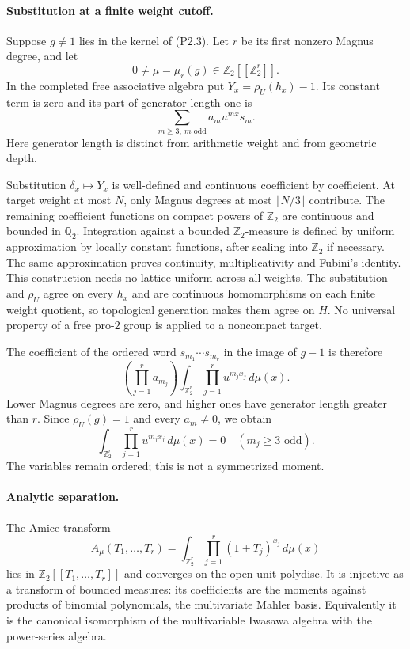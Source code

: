 \documentclass[11pt,a4paper]{article}
\theoremstyle{definition}
\begin{document}
\paragraph{Substitution at a finite weight cutoff.}
Suppose $g\neq1$ lies in the kernel of (P2.3). Let $r$ be its first nonzero Magnus degree, and let
\[
 0\neq\mu=\mu_r(g)\in\mathbb Z_2[[\mathbb Z_2^r]].
\]
In the completed free associative algebra put $Y_x=\rho_U(h_x)-1$. Its constant term is zero and its part of generator length one is
\[
 \sum_{m\geq3,\ m\text{ odd}}a_mu^{mx}s_m.
\]
Here generator length is distinct from arithmetic weight and from geometric depth.

Substitution $\delta_x\mapsto Y_x$ is well-defined and continuous coefficient by coefficient. At target weight at most $N$, only Magnus degrees at most $\lfloor N/3\rfloor$ contribute. The remaining coefficient functions on compact powers of $\mathbb Z_2$ are continuous and bounded in $\mathbb Q_2$. Integration against a bounded $\mathbb Z_2$-measure is defined by uniform approximation by locally constant functions, after scaling into $\mathbb Z_2$ if necessary. The same approximation proves continuity, multiplicativity and Fubini's identity. This construction needs no lattice uniform across all weights. The substitution and $\rho_U$ agree on every $h_x$ and are continuous homomorphisms on each finite weight quotient, so topological generation makes them agree on $H$. No universal property of a free pro-$2$ group is applied to a noncompact target.

The coefficient of the ordered word $s_{m_1}\cdots s_{m_r}$ in the image of $g-1$ is therefore
\[
 \left(\prod_{j=1}^ra_{m_j}\right)
 \int_{\mathbb Z_2^r}\prod_{j=1}^ru^{m_jx_j}\,d\mu(x).
\]
Lower Magnus degrees are zero, and higher ones have generator length greater than $r$. Since $\rho_U(g)=1$ and every $a_m\neq0$, we obtain
\[
 \int_{\mathbb Z_2^r}\prod_{j=1}^ru^{m_jx_j}\,d\mu(x)=0
 \quad(m_j\geq3\text{ odd}).                              \tag{P2.6}
\]
The variables remain ordered; this is not a symmetrized moment.

\paragraph{Analytic separation.}
The Amice transform
\[
 A_\mu(T_1,\ldots,T_r)
   =\int_{\mathbb Z_2^r}\prod_{j=1}^r(1+T_j)^{x_j}\,d\mu(x)
\]
lies in $\mathbb Z_2[[T_1,\ldots,T_r]]$ and converges on the open unit polydisc. It is injective as a transform of bounded measures: its coefficients are the moments against products of binomial polynomials, the multivariate Mahler basis. Equivalently it is the canonical isomorphism of the multivariable Iwasawa algebra with the power-series algebra.
\end{document}
